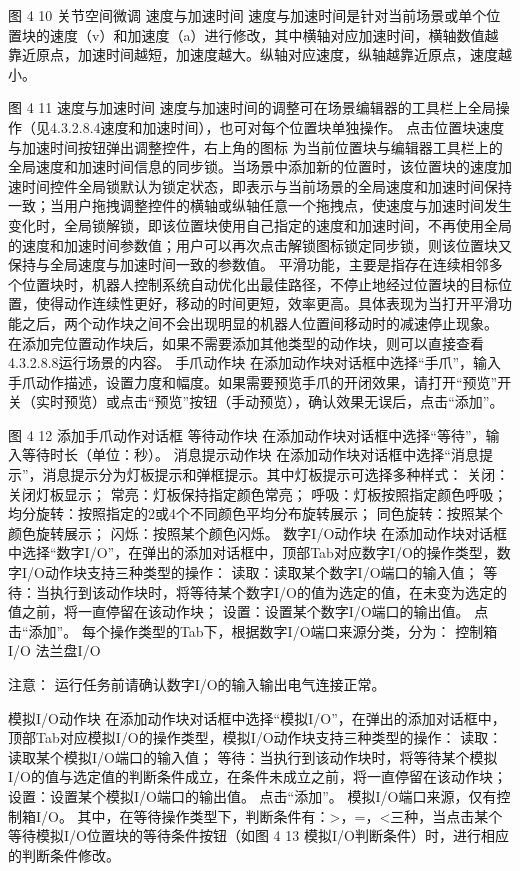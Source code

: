  
图 4 10 关节空间微调
	速度与加速时间
速度与加速时间是针对当前场景或单个位置块的速度（v）和加速度（a）进行修改，其中横轴对应加速时间，横轴数值越靠近原点，加速时间越短，加速度越大。纵轴对应速度，纵轴越靠近原点，速度越小。

 
图 4 11  速度与加速时间
速度与加速时间的调整可在场景编辑器的工具栏上全局操作（见4.3.2.8.4速度和加速时间），也可对每个位置块单独操作。 
点击位置块速度与加速时间按钮弹出调整控件，右上角的图标   为当前位置块与编辑器工具栏上的全局速度和加速时间信息的同步锁。当场景中添加新的位置时，该位置块的速度加速时间控件全局锁默认为锁定状态，即表示与当前场景的全局速度和加速时间保持一致；当用户拖拽调整控件的横轴或纵轴任意一个拖拽点，使速度与加速时间发生变化时，全局锁解锁，即该位置块使用自己指定的速度和加速时间，不再使用全局的速度和加速时间参数值；用户可以再次点击解锁图标锁定同步锁，则该位置块又保持与全局速度与加速时间一致的参数值。
平滑功能，主要是指存在连续相邻多个位置块时，机器人控制系统自动优化出最佳路径，不停止地经过位置块的目标位置，使得动作连续性更好，移动的时间更短，效率更高。具体表现为当打开平滑功能之后，两个动作块之间不会出现明显的机器人位置间移动时的减速停止现象。
在添加完位置动作块后，如果不需要添加其他类型的动作块，则可以直接查看4.3.2.8.8运行场景的内容。
手爪动作块
在添加动作块对话框中选择“手爪”，输入手爪动作描述，设置力度和幅度。如果需要预览手爪的开闭效果，请打开“预览”开关（实时预览）或点击“预览”按钮（手动预览），确认效果无误后，点击“添加”。

 
图 4 12  添加手爪动作对话框
等待动作块
在添加动作块对话框中选择“等待”，输入等待时长（单位：秒）。
消息提示动作块
在添加动作块对话框中选择“消息提示”，消息提示分为灯板提示和弹框提示。其中灯板提示可选择多种样式：
关闭：关闭灯板显示；
常亮：灯板保持指定颜色常亮；
呼吸：灯板按照指定颜色呼吸；
均分旋转：按照指定的2或4个不同颜色平均分布旋转展示；
同色旋转：按照某个颜色旋转展示；
闪烁：按照某个颜色闪烁。
数字I/O动作块
在添加动作块对话框中选择“数字I/O”，在弹出的添加对话框中，顶部Tab对应数字I/O的操作类型，数字I/O动作块支持三种类型的操作：
读取：读取某个数字I/O端口的输入值；
等待：当执行到该动作块时，将等待某个数字I/O的值为选定的值，在未变为选定的值之前，将一直停留在该动作块；
设置：设置某个数字I/O端口的输出值。
点击“添加”。
每个操作类型的Tab下，根据数字I/O端口来源分类，分为：
控制箱I/O
法兰盘I/O

 	注意：
运行任务前请确认数字I/O的输入输出电气连接正常。

模拟I/O动作块
在添加动作块对话框中选择“模拟I/O”，在弹出的添加对话框中，顶部Tab对应模拟I/O的操作类型，模拟I/O动作块支持三种类型的操作：
读取：读取某个模拟I/O端口的输入值；
等待：当执行到该动作块时，将等待某个模拟I/O的值与选定值的判断条件成立，在条件未成立之前，将一直停留在该动作块；
设置：设置某个模拟I/O端口的输出值。
点击“添加”。
模拟I/O端口来源，仅有控制箱I/O。
其中，在等待操作类型下，判断条件有：>，=，<三种，当点击某个等待模拟I/O位置块的等待条件按钮（如图 4 13 模拟I/O判断条件）时，进行相应的判断条件修改。
 
